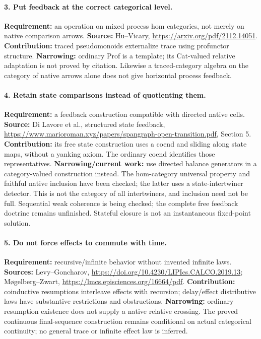 \documentclass[11pt]{article}
\begin{document}
\paragraph{3. Put feedback at the correct categorical level.}
\textbf{Requirement:} an operation on mixed process hom categories, not merely on native comparison arrows.\newline
\textbf{Source:} Hu--Vicary, \url{https://arxiv.org/pdf/2112.14051}.\newline
\textbf{Contribution:} traced pseudomonoids externalize trace using profunctor structure.\newline
\textbf{Narrowing:} ordinary Prof is a template; its Cat-valued relative adaptation is not proved by citation. Likewise a traced-category algebra on the category of native arrows alone does not give horizontal process feedback.

\paragraph{4. Retain state comparisons instead of quotienting them.}
\textbf{Requirement:} a feedback construction compatible with directed native cells.\newline
\textbf{Source:} Di Lavore et al., structured state feedback, \url{https://www.marioroman.xyz/papers/spangraph-open-transition.pdf}, Section 5.\newline
\textbf{Contribution:} its free state construction uses a coend and sliding along state maps, without a yanking axiom. The ordinary coend identifies those representatives.\newline
\textbf{Narrowing/current work:} use directed balance generators in a category-valued construction instead. The hom-category universal property and faithful native inclusion have been checked; the latter uses a state-intertwiner detector. This is not the category of all intertwiners, and inclusion need not be full. Sequential weak coherence is being checked; the complete free feedback doctrine remains unfinished. Stateful closure is not an instantaneous fixed-point solution.

\paragraph{5. Do not force effects to commute with time.}
\textbf{Requirement:} recursive/infinite behavior without invented infinite laws.\newline
\textbf{Sources:} Levy--Goncharov, \url{https://doi.org/10.4230/LIPIcs.CALCO.2019.13}; M\o gelberg--Zwart, \url{https://lmcs.episciences.org/16664/pdf}.\newline
\textbf{Contribution:} coinductive resumptions interleave effects with recursion; delay/effect distributive laws have substantive restrictions and obstructions.\newline
\textbf{Narrowing:} ordinary resumption existence does not supply a native relative crossing. The proved continuous final-sequence construction remains conditional on actual categorical continuity; no general trace or infinite effect law is inferred.
\end{document}
